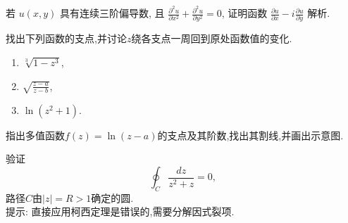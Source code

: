 \documentclass[10pt]{article}
\newenvironment{problem}[2][]{\begin{trivlist}
\item[\hskip \labelsep {\bfseries #1}\hskip \labelsep {\bfseries #2}]}{\end{trivlist}}
\begin{document}
\begin{problem}{1.6}
若 $u(x, y)$ 具有连续三阶偏导数, 且 $\frac{\partial^2 u}{\partial x^2}+\frac{\partial^2 u}{\partial y^2}=0$,
 证明函数 $\frac{\partial u}{\partial x}-i \frac{\partial u}{\partial y}$ 解析.
\end{problem}

\begin{problem}{1.7}
  找出下列函数的支点,并讨论$z$绕各支点一周回到原处函数值的变化.
  \begin{enumerate}
    \item $\sqrt[3]{1-z^3}$,
    \item $\sqrt{\frac{z-a}{z-b}}$,
    \item $\ln{(z^2 + 1)}$.
  \end{enumerate}

\end{problem}

\begin{problem}{1.8}
  指出多值函数$f(z) = \ln{(z-a)}$的支点及其阶数,找出其割线,并画出示意图.
\end{problem}


\begin{problem}{1.9}
  验证
  $$\oint_C \frac{d z}{z^2+z}=0,
  $$
  路径$C$由$|z|=R>1$确定的圆.\\

  提示: 直接应用柯西定理是错误的,需要分解因式裂项.

\end{problem}

\end{document}
